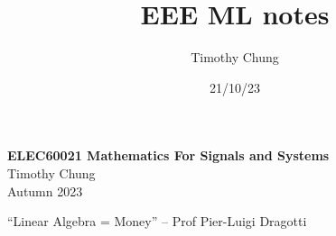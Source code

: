 \documentclass{report}
\title{EEE ML notes}
\author{Timothy Chung}
\date{21/10/23}
\begin{document}
% 
\begin{titlepage}
    \centering
    \vspace*{1cm}
    \Huge
    \textbf{ELEC60021 Mathematics For Signals and Systems} \\
    \vspace{1cm}
    \Large
    Timothy Chung \\
    \vspace{1cm}
    Autumn 2023 \\
    \vfill
\end{titlepage}

\tableofcontents
\newpage

{\Large ``Linear Algebra = Money'' – Prof Pier-Luigi Dragotti }




\end{document}
